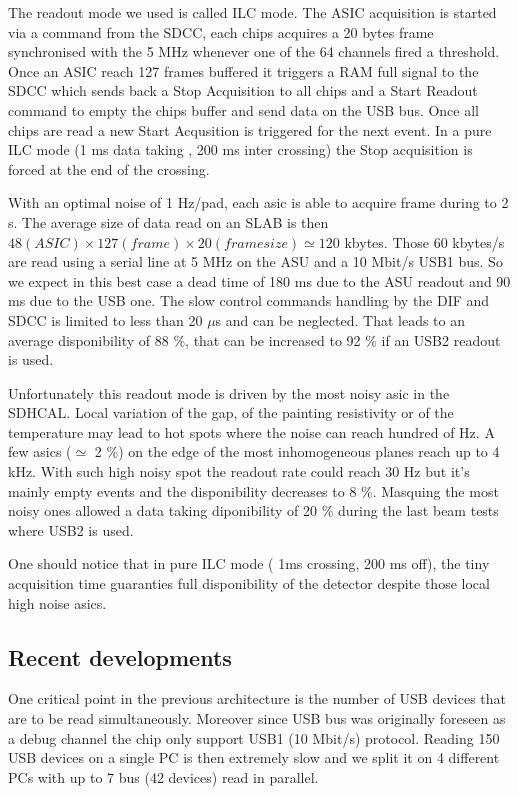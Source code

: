 \documentclass[english]{article}
\begin{document}
The readout mode we used is called ILC mode. The ASIC acquisition is started via a command from the SDCC, each chips acquires a 20 bytes frame synchronised with the 5 MHz whenever one of the 64 channels fired a threshold.
Once an ASIC reach 127 frames buffered it triggers a RAM full  signal to the SDCC which sends back a Stop Acquisition to all chips and a Start Readout command to empty the chips buffer and send data on the USB bus. Once all chips are read a new Start Acqusition is triggered for the next event. In a pure ILC mode (1 ms data taking , 200 ms inter crossing) the Stop acquisition is forced at the end of the crossing.

With an optimal noise of 1 Hz/pad, each asic is able to acquire frame during to 2 s. The average size of data read on an SLAB is then $ 48 (ASIC) \times 127 (frame) \times 20 (frame size) \simeq 120 $ kbytes. Those 60 kbytes/s are read using a serial line at 5 MHz on the ASU and a 10 Mbit/s USB1 bus. So we expect in this  best case a dead time of 180 ms due to the ASU readout and 90 ms due to the USB one. The slow control commands handling by the DIF and SDCC is limited to less than 20 $ \mu$s and can be neglected. That leads to an average disponibility of 88 \%, that can be increased to 92 \% if an USB2 readout is used.

Unfortunately this readout mode is driven by the most noisy asic in the SDHCAL. Local variation of the gap, of the painting resistivity or of the temperature may lead to hot spots where the noise can reach hundred of Hz. A few asics ($ \simeq $ 2 \%) on the edge of the most inhomogeneous  planes reach up to 4 kHz. With such high noisy spot the readout rate could reach 30 Hz but it's mainly empty events and the disponibility decreases to 8 \%. Masquing the most noisy ones allowed a data taking diponibility of 20 \% during the last beam tests where USB2 is used.

One should notice that in pure ILC mode ( 1ms crossing, 200 ms off), the tiny acquisition time guaranties full disponibility of the detector despite those local high noise asics.               



\subsection{Recent developments}

One critical point in the previous architecture is the number of USB devices that are to be read simultaneously. Moreover since USB bus was originally foreseen as a debug channel the chip only support USB1 (10 Mbit/s) protocol. Reading  150 USB devices on a single PC is then extremely slow and we split it on 4 different PCs with up to 7 bus (42 devices) read in parallel.
\end{document}
